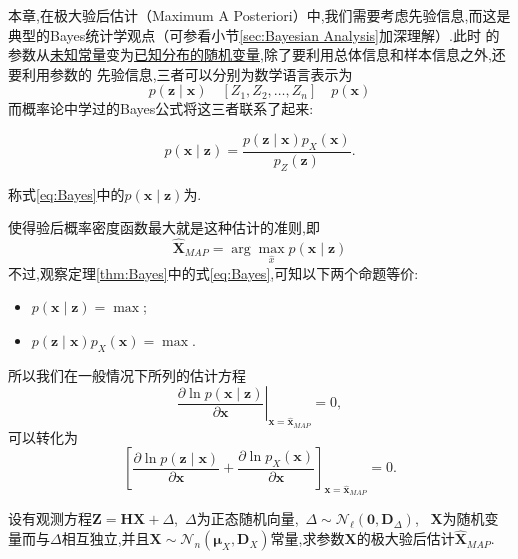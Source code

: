 \documentclass[cn,10pt,citestyle=gb7714-2015,bibstyle=gb7714-2015]{elegantbook}
\renewcommand{\l}{\ell}
\begin{document}
本章,在极大验后估计（Maximum A Posteriori）中,我们需要考虑先验信息,而这是典型的Bayes统计学观点（可参看小节\ref{sec:Bayesian Analysis}加深理解）.此时
的参数从\uline{未知常量}变为\uline{已知分布的随机变量},除了要利用总体信息和样本信息之外,还要利用参数的
先验信息,三者可以分别为数学语言表示为
\[
    p(\bm{z}\mid \bm{x})\quad [Z_1,Z_2,\ldots,Z_n]\quad p(\bm{x})
\]
而概率论中学过的Bayes公式将这三者联系了起来:
\begin{theorem}[Bayes公式]\label{thm:Bayes}
  \begin{equation}\label{eq:Bayes}
    p(\bm{x}\mid\bm{z})=\frac{p(\bm{z}\mid\bm{x})p_X(\bm{x})}{p_Z(\bm{z})}.
  \end{equation}
\end{theorem}
称式\eqref{eq:Bayes}中的$p(\bm{x}\mid\bm{z})$为.
\begin{theorem}[极大验后准则]\label{MAP-principle}
  使得验后概率密度函数最大就是这种估计的准则,即
  \begin{equation}
    \hat{\bm{X}}_{MAP}=\arg\max_{\hat{x}}p(\bm{x}\mid\bm{z})
  \end{equation}
  不过,观察定理\ref{thm:Bayes}中的式\eqref{eq:Bayes},可知以下两个命题等价:
\begin{itemize}
  \item $p(\bm{x}\mid\bm{z})=\max$;
  \item $p(\bm{z}\mid\bm{x})p_X(\bm{x})=\max$.
\end{itemize}
所以我们在一般情况下所列的估计方程
\begin{equation}
  \left.\frac{\partial \ln p(\bm{x}\mid\bm{z})}{\partial \bm{x}}\right|_{\bm{x}=\hat{\bm{x}}_{MAP}}=0,
\end{equation}
可以转化为
\begin{equation}
  \left[\frac{\partial \ln p(\bm{z}\mid\bm{x})}{\partial \bm{x}}+\frac{\partial\ln p_X(\bm{x})}{\partial\bm{x}}\right]_{\bm{x}=\hat{\bm{x}}_{MAP}}=0.
\end{equation}
\end{theorem}
\begin{example}
  设有观测方程$\bm{Z}=\bm{H}\bm{X}+\bm{\varDelta}$,\ $\bm{\varDelta}$为正态随机向量,\ $\bm{\varDelta}\sim\mathcal{N}_\l(\bm{0},\bm{D}_{\varDelta})$,
  \ $\bm{X}$为随机变量而与$\bm{\varDelta}$相互独立,并且$\bm{X}\sim\mathcal{N}_n(\bm{\mu}_{X},\bm{D}_{X})$常量,求参数$\bm{X}$的极大验后估计$\hat{\bm{X}}_{MAP}$.
\end{example}
\end{document}
